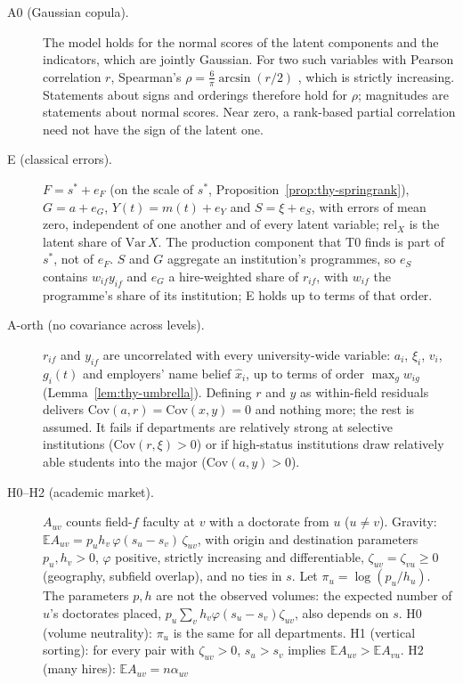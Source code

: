 \begin{description}
\item[A0 (Gaussian copula).] The model holds for the normal scores of the latent components and the indicators, which
are jointly Gaussian. For two such variables with Pearson correlation $r$, Spearman's
$\rho=\tfrac{6}{\pi}\arcsin(r/2)$ \citep{kruskal1958ordinal}, which is strictly increasing. Statements about signs
and orderings therefore hold for $\rho$; magnitudes are statements about normal scores. Near zero, a rank-based
partial correlation need not have the sign of the latent one.
\item[E (classical errors).] $F=s^*+e_F$ (on the scale of $s^*$, Proposition~\ref{prop:thy-springrank}),
$G=a+e_G$, $Y(t)=m(t)+e_Y$ and $S=\xi+e_S$, with errors of mean zero, independent of one another and of every
latent variable; $\mathrm{rel}_X$ is the latent share of $\mathrm{Var}\,X$. The production component that T0 finds
is part of $s^*$, not of $e_F$. $S$ and $G$ aggregate an institution's programmes, so $e_S$ contains
$w_{if}y_{if}$ and $e_G$ a hire-weighted share of $r_{if}$, with $w_{if}$ the programme's share of its institution;
E holds up to terms of that order.
\item[A-orth (no covariance across levels).] $r_{if}$ and $y_{if}$ are uncorrelated with every university-wide
variable: $a_i$, $\xi_i$, $v_i$, $g_i(t)$ and employers' name belief $\hat x_i$, up to terms of order
$\max_gw_{ig}$ (Lemma~\ref{lem:thy-umbrella}). Defining $r$ and $y$ as within-field residuals delivers
$\mathrm{Cov}(a,r)=\mathrm{Cov}(x,y)=0$ and nothing more; the rest is assumed. It fails if departments are relatively
strong at selective institutions ($\mathrm{Cov}(r,\xi)>0$) or if high-status institutions draw relatively able
students into the major ($\mathrm{Cov}(a,y)>0$).
\item[H0--H2 (academic market).] $A_{uv}$ counts field-$f$ faculty at $v$ with a doctorate from $u$ ($u\neq v$).
Gravity: $\mathbb EA_{uv}=p_uh_v\,\varphi(s_u-s_v)\,\zeta_{uv}$, with origin and destination parameters
$p_u,h_v>0$, $\varphi$ positive, strictly increasing and differentiable, $\zeta_{uv}=\zeta_{vu}\ge0$ (geography,
subfield overlap), and no ties in $s$. Let $\pi_u=\log(p_u/h_u)$. The parameters $p,h$ are not the observed volumes:
the expected number of $u$'s doctorates placed, $p_u\sum_vh_v\varphi(s_u-s_v)\zeta_{uv}$, also depends on $s$. H0
(volume neutrality): $\pi_u$ is the same for all departments. H1 (vertical sorting): for every pair with
$\zeta_{uv}>0$, $s_u>s_v$ implies $\mathbb EA_{uv}>\mathbb EA_{vu}$. H2 (many hires): $\mathbb EA_{uv}=n\alpha_{uv}$

\end{description}
